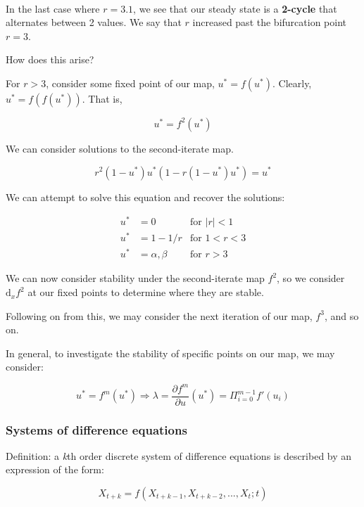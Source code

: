\documentclass[11pt]{article}
\begin{document}
    \begin{center}
    \end{center}
    { \hspace*{\fill} \\}
    
    In the last case where \(r = 3.1\), we see that our steady state is a
\textbf{2-cycle} that alternates between 2 values. We say that \(r\)
increased past the bifurcation point \(r = 3\).

How does this arise?

For \(r > 3\), consider some fixed point of our map, \(u^* = f(u^*)\).
Clearly, \(u^* = f(f(u^*))\). That is,

\[u^* = f^2(u^*)\]

We can consider solutions to the second-iterate map.

\[r^2(1-u^*)u^*(1-r(1-u^*)u^*) = u^*\]

We can attempt to solve this equation and recover the solutions:

\begin{align*}
    u^* &= 0 &\text{for } |r| < 1\\
    u^* &= 1 - 1/r &\text{for } 1 < r < 3\\
    u^* &= \alpha, \beta &\text{for } r > 3
\end{align*}

We can now consider stability under the second-iterate map \(f^2\), so
we consider \(\mathrm{d}_x f^2\) at our fixed points to determine where
they are stable.

Following on from this, we may consider the next iteration of our map,
\(f^3\), and so on.

In general, to investigate the stability of specific points on our map,
we may consider:

\[u^* = f^m(u^*) \Rightarrow \lambda = \dfrac{\partial f^m}{\partial u}(u^*) = \Pi_{i = 0}^{m-1} f'(u_i)\]

\subsubsection{Systems of difference
equations}\label{systems-of-difference-equations}

Definition: a \emph{k}th order discrete system of difference equations
is described by an expression of the form:

\[X_{t+k} = f(X_{t+k-1}, X_{t+k-2}, ..., X_t ; t)\]
\end{document}

